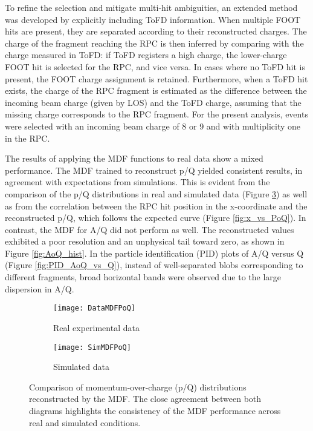 To refine the selection and mitigate multi-hit ambiguities, an extended method was developed by explicitly including \gls{ToFD} information. When multiple FOOT hits are present, they are separated according to their reconstructed charges. The charge of the fragment reaching the \gls{RPC} is then inferred by comparing with the charge measured in \gls{ToFD}: if \gls{ToFD} registers a high charge, the lower-charge FOOT hit is selected for the \gls{RPC}, and vice versa. In cases where no \gls{ToFD} hit is present, the FOOT charge assignment is retained. Furthermore, when a \gls{ToFD} hit exists, the charge of the \gls{RPC} fragment is estimated as the difference between the incoming beam charge (given by LOS) and the \gls{ToFD} charge, assuming that the missing charge corresponds to the \gls{RPC} fragment. For the present analysis, events were selected with an incoming beam charge of 8 or 9 and with multiplicity one in the \gls{RPC}.

The results of applying the \gls{MDF} functions to real data show a mixed performance. The \gls{MDF} trained to reconstruct p/Q yielded consistent results, in agreement with expectations from simulations. This is evident from the comparison of the p/Q distributions in real and simulated data (Figure \ref{fig:PoQ_comparison}) as well as from the correlation between the \gls{RPC} hit position in the x-coordinate and the reconstructed p/Q, which follows the expected curve (Figure \ref{fig:x_vs_PoQ}). In contrast, the \gls{MDF} for A/Q did not perform as well. The reconstructed values exhibited a poor resolution and an unphysical tail toward zero, as shown in Figure \ref{fig:AoQ_hist}. In the particle identification (PID) plots of A/Q versus Q (Figure \ref{fig:PID_AoQ_vs_Q}), instead of well-separated blobs corresponding to different fragments, broad horizontal bands were observed due to the large dispersion in A/Q.

\begin{figure}
	\centering
	\begin{subfigure}{.57\textwidth}
		\centering
		\texttt{[image: DataMDFPoQ]}
		\caption{Real experimental data}
		\label{fig:DataMDFPoQ}
	\end{subfigure}%
	\begin{subfigure}{.43\textwidth}
		\centering
		\texttt{[image: SimMDFPoQ]}
		\caption{Simulated data}
		\label{fig:SimMDFPoQ}
	\end{subfigure}
	\caption[P/Q from MDF: experimental data vs. simulations]{Comparison of momentum-over-charge (p/Q) distributions reconstructed by the \gls{MDF}. The close agreement between both diagrams highlights the consistency of the \gls{MDF} performance across real and simulated conditions.}
	\label{fig:PoQ_comparison}
\end{figure}


